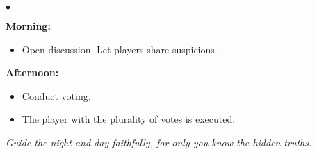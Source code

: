 \documentclass[12pt, a4paper]{article}
\newcommand{\sectiondivider}{%
  \par\noindent\hrulefill\quad\textbf{$\bullet$}\quad\hrulefill\par
}
\begin{document}
\vspace{0.2cm}

\begin{tcolorbox}[narrbox, title={Day Sequence}]
\sectiondivider

\textbf{Morning:}
\begin{itemize}[leftmargin=2em, itemsep=2pt]
    \item Open discussion. Let players share suspicions.
\end{itemize}

\textbf{Afternoon:}
\begin{itemize}[leftmargin=2em, itemsep=2pt]
    \item Conduct voting.
    \item The player with the plurality of votes is executed.
\end{itemize}
\end{tcolorbox}

\vspace{1cm}
\begin{center}
    \textit{Guide the night and day faithfully, for only you know the hidden truths.}
\end{center}
\end{document}

